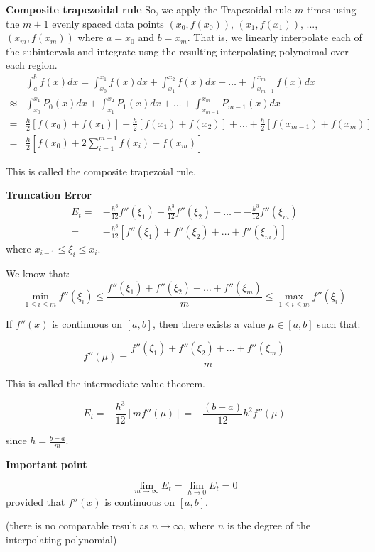 \documentclass [titlepage,12pt,letter] {article}
\begin{document}
{\bf Composite trapezoidal rule} 
\noindent
So, we apply the Trapezoidal rule $m$ times using the $m+1$ evenly spaced data points $(x_0,f(x_0))$, $(x_1,f(x_1))$, ..., $(x_m,f(x_m))$ where $a=x_0$ and $b=x_m$. That is, we linearly interpolate each of the subintervals and integrate usng the resulting interpolating polynoimal over each region.
\begin{align*} 
& \int_{a}^{b} f(x)dx = \int_{x_0}^{x_1}f(x)dx +  \int_{x_1}^{x_2}f(x)dx + \dots + \int_{x_{m-1}}^{x_m}f(x)dx \\ 
\approx & \int_{x_0}^{x_1}P_0(x)dx +  \int_{x_1}^{x_2}P_1(x)dx + \dots + \int_{x_{m-1}}^{x_m}P_{m-1}(x)dx \\
=& \frac{h}{2} \left [ f(x_0) + f(x_1) \right ] + \frac{h}{2} \left [ f(x_1) + f(x_2) \right ] + \dots + \frac{h}{2} \left [ f(x_{m-1}) + f(x_{m}) \right ] \\ 
=& \frac{h}{2} \left [ f(x_0) + 2\sum_{i=1}^{m-1} f(x_i) + f(x_m) \right ] 
\end{align*} 

This is called the composite trapezoial rule. 


{\bf Truncation Error}
\begin{align*} 
E_t =& -\frac{h^3}{12} f''(\xi_1) -\frac{h^3}{12} f''(\xi_2) - \dots - -\frac{h^3}{12} f''(\xi_m)  \\
=& -\frac{h^3}{12} \left [ f''(\xi_1) + f''(\xi_2) + \dots + f''(\xi_m) \right ] 
\end{align*} 
where $x_{i-1} \leq \xi_i \leq x_i$. 

We know that: 
\[
\min_{1 \leq i \leq m} f''(\xi_i) \leq \frac{f''(\xi_1) + f''(\xi_2) + \dots + f''(\xi_m)}{m} \leq \max_{1 \leq i \leq m} f''(\xi_i) 
\]

If $f''(x)$ is continuous on $[a,b]$, then there exists a value $\mu \in [a,b]$ such that: 

\[
f''(\mu) = \frac{f''(\xi_1) + f''(\xi_2) + \dots + f''(\xi_m)}{m} 
\]

This is called the intermediate value theorem. 

\[
E_t = - \frac{h^3}{12} [ m f''(\mu)] = - \frac{(b-a)}{12} h^2 f''(\mu) 
\]

since $h = \frac{b-a}{m}$. 

{\bf Important point} 

\[\lim_{m \rightarrow \infty} E_t = \lim_{h \rightarrow 0} E_t = 0
\]
provided that $f''(x)$ is continuous on $[a,b]$. 

\noindent 
(there is no comparable result as $n \rightarrow \infty$, where $n$ is the degree of the interpolating polynomial) 
\end{document}
